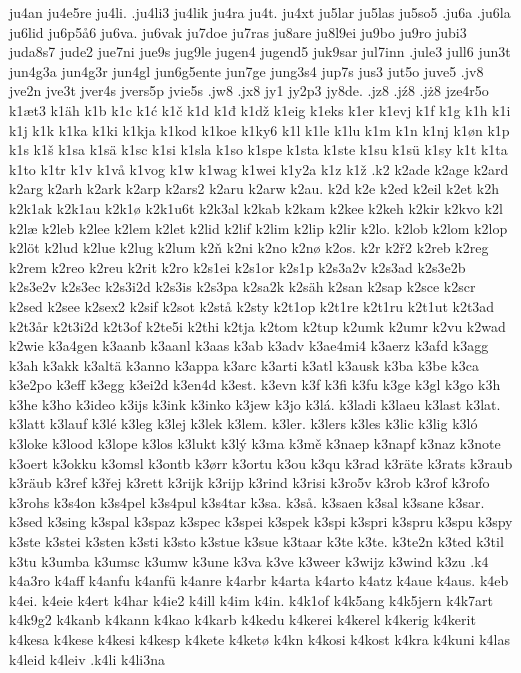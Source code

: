 {{ju4an
ju4e5re
ju4li.
.ju4li3
ju4lik
ju4ra
ju4t.
ju4xt
ju5lar
ju5las
ju5so5
.ju6a
.ju6la
ju6lid
ju6p5å6
ju6va.
ju6vak
ju7doe
ju7ras
ju8are
ju8l9ei
ju9bo
ju9ro
jubi3
juda8s7
jude2
jue7ni
jue9s
jug9le
jugen4
jugend5
juk9sar
jul7inn
.jule3
jull6
jun3t
jun4g3a
jun4g3r
jun4gl
jun6g5ente
jun7ge
jung3s4
jup7s
jus3
jut5o
juve5
.jv8
jve2n
jve3t
jver4s
jvers5p
jvie5s
.jw8
.jx8
jy1
jy2p3
jy8de.
.jz8
.jź8
.jż8
jze4r5o
k1æt3
k1äh
k1b
k1c
k1ć
k1č
k1d
k1đ
k1dž
k1eig
k1eks
k1er
k1evj
k1f
k1g
k1h
k1i
k1j
k1k
k1ka
k1ki
k1kja
k1kod
k1koe
k1ky6
k1l
k1le
k1lu
k1m
k1n
k1nj
k1øn
k1p
k1s
k1š
k1sa
k1sä
k1sc
k1si
k1sla
k1so
k1spe
k1sta
k1ste
k1su
k1sü
k1sy
k1t
k1ta
k1to
k1tr
k1v
k1vå
k1vog
k1w
k1wag
k1wei
k1y2a
k1z
k1ž
.k2
k2ade
k2age
k2ard
k2arg
k2arh
k2ark
k2arp
k2ars2
k2aru
k2arw
k2au.
k2d
k2e
k2ed
k2eil
k2et
k2h
k2k1ak
k2k1au
k2k1ø
k2k1u6t
k2k3al
k2kab
k2kam
k2kee
k2keh
k2kir
k2kvo
k2l
k2læ
k2leb
k2lee
k2lem
k2let
k2lid
k2lif
k2lim
k2lip
k2lir
k2lo.
k2lob
k2lom
k2lop
k2löt
k2lud
k2lue
k2lug
k2lum
k2ň
k2ni
k2no
k2nø
k2os.
k2r
k2ř2
k2reb
k2reg
k2rem
k2reo
k2reu
k2rit
k2ro
k2s1ei
k2s1or
k2s1p
k2s3a2v
k2s3ad
k2s3e2b
k2s3e2v
k2s3ec
k2s3i2d
k2s3is
k2s3pa
k2sa2k
k2säh
k2san
k2sap
k2sce
k2scr
k2sed
k2see
k2sex2
k2sif
k2sot
k2stå
k2sty
k2t1op
k2t1re
k2t1ru
k2t1ut
k2t3ad
k2t3år
k2t3i2d
k2t3of
k2te5i
k2thi
k2tja
k2tom
k2tup
k2umk
k2umr
k2vu
k2wad
k2wie
k3a4gen
k3aanb
k3aanl
k3aas
k3ab
k3adv
k3ae4mi4
k3aerz
k3afd
k3agg
k3ah
k3akk
k3altä
k3anno
k3appa
k3arc
k3arti
k3atl
k3ausk
k3ba
k3be
k3ca
k3e2po
k3eff
k3egg
k3ei2d
k3en4d
k3est.
k3evn
k3f
k3fi
k3fu
k3ge
k3gl
k3go
k3h
k3he
k3ho
k3ideo
k3ijs
k3ink
k3inko
k3jew
k3jo
k3lá.
k3ladi
k3laeu
k3last
k3lat.
k3latt
k3lauf
k3lé
k3leg
k3lej
k3lek
k3lem.
k3ler.
k3lers
k3les
k3lic
k3lig
k3ló
k3loke
k3lood
k3lope
k3los
k3lukt
k3lý
k3ma
k3mě
k3naep
k3napf
k3naz
k3note
k3oert
k3okku
k3omsl
k3ontb
k3ørr
k3ortu
k3ou
k3qu
k3rad
k3räte
k3rats
k3raub
k3räub
k3ref
k3řej
k3rett
k3rijk
k3rijp
k3rind
k3risi
k3ro5v
k3rob
k3rof
k3rofo
k3rohs
k3s4on
k3s4pel
k3s4pul
k3s4tar
k3sa.
k3så.
k3saen
k3sal
k3sane
k3sar.
k3sed
k3sing
k3spal
k3spaz
k3spec
k3spei
k3spek
k3spi
k3spri
k3spru
k3spu
k3spy
k3ste
k3stei
k3sten
k3sti
k3sto
k3stue
k3sue
k3taar
k3te
k3te.
k3te2n
k3ted
k3til
k3tu
k3umba
k3umsc
k3umw
k3une
k3va
k3ve
k3weer
k3wijz
k3wind
k3zu
.k4
k4a3ro
k4aff
k4anfu
k4anfü
k4anre
k4arbr
k4arta
k4arto
k4atz
k4aue
k4aus.
k4eb
k4ei.
k4eie
k4ert
k4har
k4ie2
k4ill
k4im
k4in.
k4k1of
k4k5ang
k4k5jern
k4k7art
k4k9g2
k4kanb
k4kann
k4kao
k4karb
k4kedu
k4kerei
k4kerel
k4kerig
k4kerit
k4kesa
k4kese
k4kesi
k4kesp
k4kete
k4ketø
k4kn
k4kosi
k4kost
k4kra
k4kuni
k4las
k4leid
k4leiv
.k4li
k4li3na
}}
